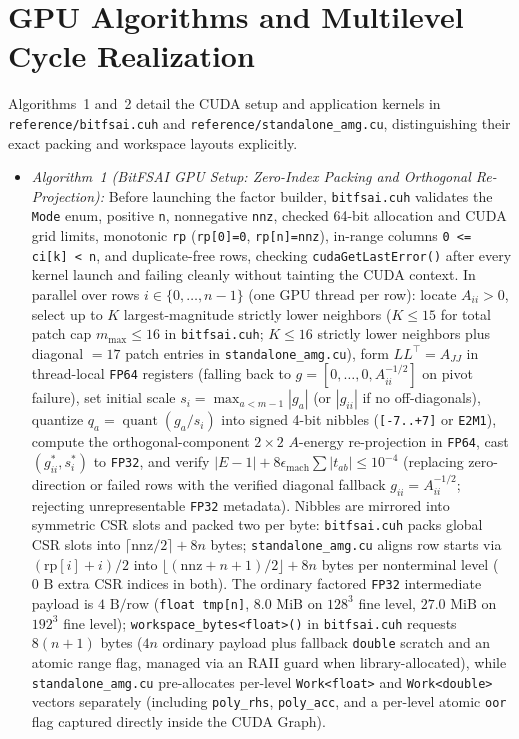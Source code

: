 \documentclass[10pt]{article}
\begin{document}
\section{GPU Algorithms and Multilevel Cycle Realization}\label{sec:gpu_alg}
Algorithms~1 and~2 detail the CUDA setup and application kernels in \texttt{reference/bitfsai.cuh} and \texttt{reference/standalone\_amg.cu}, distinguishing their exact packing and workspace layouts explicitly.

\begin{itemize}
  \item \emph{Algorithm~1 (BitFSAI GPU Setup: Zero-Index Packing and Orthogonal Re-Projection):} Before launching the factor builder, \texttt{bitfsai.cuh} validates the \texttt{Mode} enum, positive \texttt{n}, nonnegative \texttt{nnz}, checked 64-bit allocation and CUDA grid limits, monotonic \texttt{rp} (\texttt{rp[0]=0}, \texttt{rp[n]=nnz}), in-range columns \texttt{0 <= ci[k] < n}, and duplicate-free rows, checking \texttt{cudaGetLastError()} after every kernel launch and failing cleanly without tainting the CUDA context. In parallel over rows $i \in \{0,\dots,n-1\}$ (one GPU thread per row): locate $A_{ii} > 0$, select up to $K$ largest-magnitude strictly lower neighbors ($K \le 15$ for total patch cap $m_{\max} \le 16$ in \texttt{bitfsai.cuh}; $K \le 16$ strictly lower neighbors plus diagonal $= 17$ patch entries in \texttt{standalone\_amg.cu}), form $L L^\top = A_{JJ}$ in thread-local \texttt{FP64} registers (falling back to $g = [0,\dots,0, A_{ii}^{-1/2}]$ on pivot failure), set initial scale $s_i = \max_{a < m-1}|g_a|$ (or $|g_{ii}|$ if no off-diagonals), quantize $q_a = \operatorname{quant}(g_a/s_i)$ into signed 4-bit nibbles (\texttt{[-7..+7]} or \texttt{E2M1}), compute the orthogonal-component $2\times 2$ $A$-energy re-projection in \texttt{FP64}, cast $(g_{ii}^*, s_i^*)$ to \texttt{FP32}, and verify $|E - 1| + 8\epsilon_{\mathrm{mach}}\sum |t_{ab}| \le 10^{-4}$ (replacing zero-direction or failed rows with the verified diagonal fallback $g_{ii} = A_{ii}^{-1/2}$; rejecting unrepresentable \texttt{FP32} metadata). Nibbles are mirrored into symmetric CSR slots and packed two per byte: \texttt{bitfsai.cuh} packs global CSR slots into $\lceil\mathrm{nnz}/2\rceil + 8n$ bytes; \texttt{standalone\_amg.cu} aligns row starts via $(\mathrm{rp}[i]+i)/2$ into $\lfloor(\mathrm{nnz} + n + 1)/2\rfloor + 8n$ bytes per nonterminal level ($0\text{ B}$ extra CSR indices in both). The ordinary factored \texttt{FP32} intermediate payload is $4\text{ B/row}$ (\texttt{float tmp[n]}, $8.0\text{ MiB}$ on $128^3$ fine level, $27.0\text{ MiB}$ on $192^3$ fine level); \texttt{workspace\_bytes<float>()} in \texttt{bitfsai.cuh} requests $8(n+1)$ bytes ($4n$ ordinary payload plus fallback \texttt{double} scratch and an atomic range flag, managed via an RAII guard when library-allocated), while \texttt{standalone\_amg.cu} pre-allocates per-level \texttt{Work<float>} and \texttt{Work<double>} vectors separately (including \texttt{poly\_rhs}, \texttt{poly\_acc}, and a per-level atomic \texttt{oor} flag captured directly inside the CUDA Graph).

\end{itemize}
\end{document}
